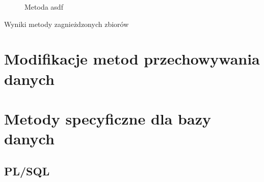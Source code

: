 \documentclass[12pt,a4paper,oneside]{report}
\begin{document}
\begin{figure}
\begin{center}
\end{center}
\caption{Metoda asdf}
\label{fig:img_chart_simple}
\end{figure}

\begin{table}[h]
  \caption{Wyniki metody zagnieżdzonych zbiorów}
   \begin{center}
   \end{center}
\end{table}
	
	
	





\chapter{Modifikacje metod przechowywania danych}


\chapter{Metody specyficzne dla bazy danych}
	\section{PL/SQL}

	
	
	
\end{document}
